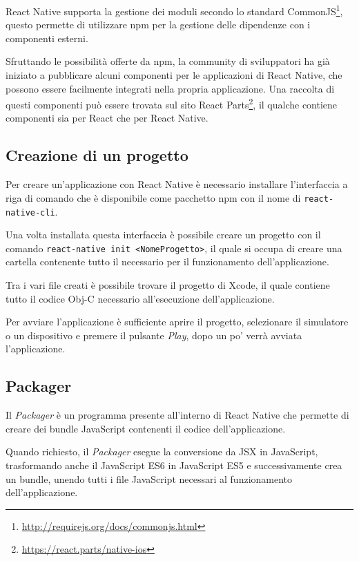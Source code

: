 React Native supporta la gestione dei moduli secondo lo standard CommonJS\footnote{\url{http://requirejs.org/docs/commonjs.html}}, questo permette di utilizzare npm per la gestione delle dipendenze con i componenti esterni.

Sfruttando le possibilità offerte da npm, la community di sviluppatori ha già iniziato a pubblicare alcuni componenti per le applicazioni di React Native, che possono essere facilmente integrati nella propria applicazione.
Una raccolta di questi componenti può essere trovata sul sito React Parts\footnote{\url{https://react.parts/native-ios}}, il qualche contiene componenti sia per React che per React Native.

\subsection{Creazione di un progetto}

Per creare un'applicazione con React Native è necessario installare l'interfaccia a riga di comando che è disponibile come pacchetto npm con il nome di \texttt{react-native-cli}.

Una volta installata questa interfaccia è possibile creare un progetto con il comando \texttt{react-native init <NomeProgetto>}, il quale si occupa di creare una cartella contenente tutto il necessario per il funzionamento dell'applicazione.

Tra i vari file creati è possibile trovare il progetto di Xcode, il quale contiene tutto il codice Obj-C necessario all'esecuzione dell'applicazione.

Per avviare l'applicazione è sufficiente aprire il progetto, selezionare il simulatore o un dispositivo e premere il pulsante \textit{Play}, dopo un po' verrà avviata l'applicazione.

\subsection{Packager}\label{sec:packager}

Il \textit{Packager} è un programma presente all'interno di React Native che permette di creare dei bundle JavaScript contenenti il codice dell'applicazione.

Quando richiesto, il \textit{Packager} esegue la conversione da JSX in JavaScript, trasformando anche il JavaScript ES6 in JavaScript ES5 e successivamente crea un bundle, unendo tutti i file JavaScript necessari al funzionamento dell'applicazione.

